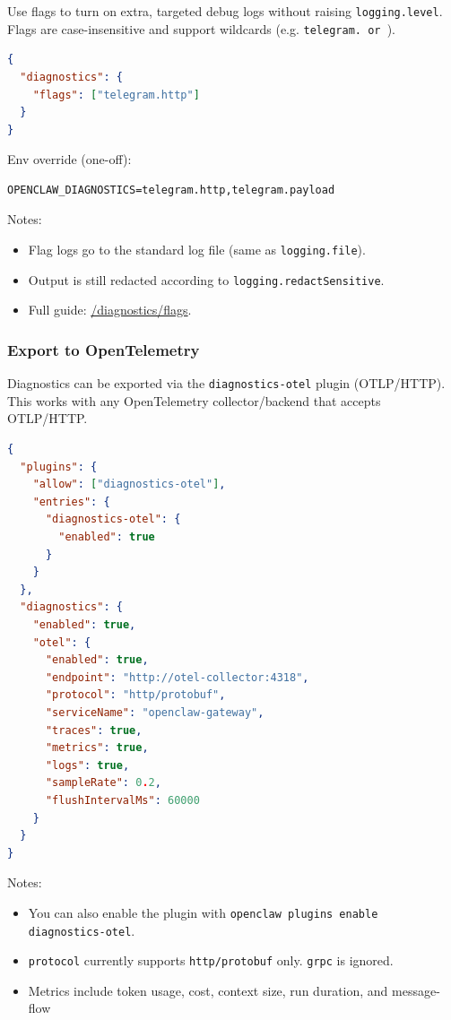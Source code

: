 Use flags to turn on extra, targeted debug logs without raising \texttt{logging.level}.
Flags are case-insensitive and support wildcards (e.g. \texttt{telegram.\textit{} or \texttt{}}).

\begin{lstlisting}[language=json]
{
  "diagnostics": {
    "flags": ["telegram.http"]
  }
}
\end{lstlisting}


Env override (one-off):

\begin{lstlisting}
OPENCLAW_DIAGNOSTICS=telegram.http,telegram.payload
\end{lstlisting}


Notes:

\begin{itemize}
  \item Flag logs go to the standard log file (same as \texttt{logging.file}).
  \item Output is still redacted according to \texttt{logging.redactSensitive}.
  \item Full guide: \href{/diagnostics/flags}{/diagnostics/flags}.
\end{itemize}


\subsubsection{Export to OpenTelemetry}


Diagnostics can be exported via the \texttt{diagnostics-otel} plugin (OTLP/HTTP). This
works with any OpenTelemetry collector/backend that accepts OTLP/HTTP.

\begin{lstlisting}[language=json]
{
  "plugins": {
    "allow": ["diagnostics-otel"],
    "entries": {
      "diagnostics-otel": {
        "enabled": true
      }
    }
  },
  "diagnostics": {
    "enabled": true,
    "otel": {
      "enabled": true,
      "endpoint": "http://otel-collector:4318",
      "protocol": "http/protobuf",
      "serviceName": "openclaw-gateway",
      "traces": true,
      "metrics": true,
      "logs": true,
      "sampleRate": 0.2,
      "flushIntervalMs": 60000
    }
  }
}
\end{lstlisting}


Notes:

\begin{itemize}
  \item You can also enable the plugin with \texttt{openclaw plugins enable diagnostics-otel}.
  \item \texttt{protocol} currently supports \texttt{http/protobuf} only. \texttt{grpc} is ignored.
  \item Metrics include token usage, cost, context size, run duration, and message-flow
\end{itemize}

